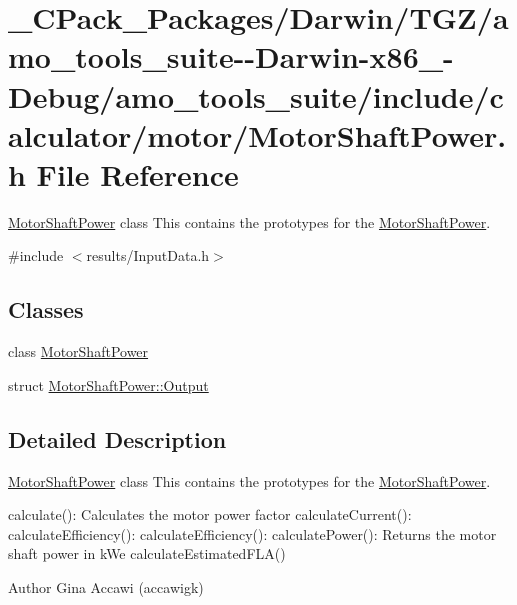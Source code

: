 \hypertarget{___c_pack___packages_2_darwin_2_t_g_z_2amo__tools__suite--_darwin-x86__64-_debug_2amo__tools__su9871b790a5a46f34e25f975cc1beabf9}{}\section{\+\_\+\+C\+Pack\+\_\+\+Packages/\+Darwin/\+T\+G\+Z/amo\+\_\+tools\+\_\+suite-\/-\/\+Darwin-\/x86\+\_-\/\+Debug/amo\+\_\+tools\+\_\+suite/include/calculator/motor/\+Motor\+Shaft\+Power.h File Reference}
\label{___c_pack___packages_2_darwin_2_t_g_z_2amo__tools__suite--_darwin-x86__64-_debug_2amo__tools__su9871b790a5a46f34e25f975cc1beabf9}


\hyperlink{class_motor_shaft_power}{Motor\+Shaft\+Power} class This contains the prototypes for the \hyperlink{class_motor_shaft_power}{Motor\+Shaft\+Power}.  


{\ttfamily \#include $<$results/\+Input\+Data.\+h$>$}\newline
\subsection*{Classes}
\begin{DoxyCompactItemize}
\item 
class \hyperlink{class_motor_shaft_power}{Motor\+Shaft\+Power}
\item 
struct \hyperlink{struct_motor_shaft_power_1_1_output}{Motor\+Shaft\+Power\+::\+Output}
\end{DoxyCompactItemize}


\subsection{Detailed Description}
\hyperlink{class_motor_shaft_power}{Motor\+Shaft\+Power} class This contains the prototypes for the \hyperlink{class_motor_shaft_power}{Motor\+Shaft\+Power}. 

calculate()\+: Calculates the motor power factor calculate\+Current()\+: calculate\+Efficiency()\+: calculate\+Efficiency()\+: calculate\+Power()\+: Returns the motor shaft power in k\+We calculate\+Estimated\+F\+L\+A()

\begin{DoxyAuthor}{Author}
Gina Accawi (accawigk) 
\end{DoxyAuthor}
